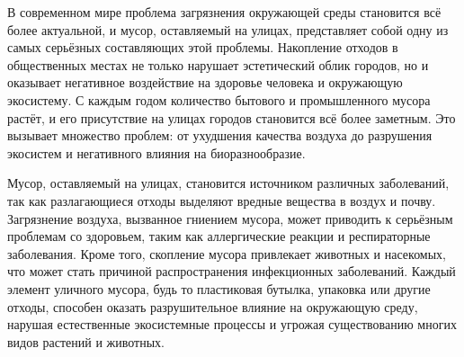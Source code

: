\documentclass[diploma]{SCWorks}
\begin{document}

\date{2025}

\maketitle


\tableofcontents




\sloppy

\intro

В современном мире проблема загрязнения окружающей среды становится всё более 
актуальной, и мусор, оставляемый на улицах, представляет собой одну из самых 
серьёзных составляющих этой проблемы. Накопление отходов в общественных местах 
не только нарушает эстетический облик городов, но и оказывает негативное 
воздействие на здоровье человека и окружающую экосистему. С каждым годом 
количество бытового и промышленного мусора растёт, и его присутствие на 
улицах городов становится всё более заметным. Это вызывает множество проблем: 
от ухудшения качества воздуха до разрушения экосистем и негативного влияния 
на биоразнообразие.

Мусор, оставляемый на улицах, становится источником различных заболеваний, так 
как разлагающиеся отходы выделяют вредные вещества в воздух и почву. 
Загрязнение воздуха, вызванное гниением мусора, может приводить к серьёзным 
проблемам со здоровьем, таким как аллергические реакции и респираторные 
заболевания. Кроме того, скопление мусора привлекает животных и насекомых, 
что может стать причиной распространения инфекционных заболеваний. Каждый 
элемент уличного мусора, будь то пластиковая бутылка, упаковка или другие 
отходы, способен оказать разрушительное влияние на окружающую среду, нарушая 
естественные экосистемные процессы и угрожая существованию многих видов 
растений и животных.
\end{document}
